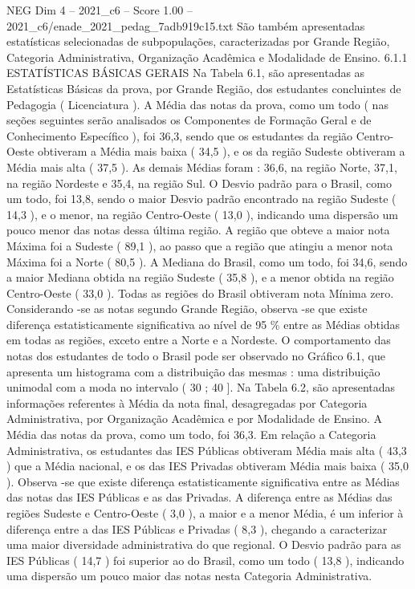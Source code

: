 \begin{textsample}{NEG Dim 4 – 2021\_c6 – Score 1.00 – 2021\_c6/enade\_2021\_pedag\_7adb919c15.txt}
São também apresentadas estatísticas selecionadas de subpopulações, caracterizadas por Grande Região, Categoria Administrativa, Organização Acadêmica e Modalidade de Ensino. 6.1.1 ESTATÍSTICAS BÁSICAS GERAIS Na Tabela 6.1, são apresentadas as Estatísticas Básicas da prova, por Grande Região, dos estudantes concluintes de Pedagogia ( Licenciatura ).
A Média das notas da prova, como um todo ( nas seções seguintes serão analisados os Componentes de Formação Geral e de Conhecimento Específico ), foi 36,3, sendo que os estudantes da região Centro-Oeste obtiveram a Média mais baixa ( 34,5 ), e os da região Sudeste obtiveram a Média mais alta ( 37,5 ).
As demais Médias foram : 36,6, na região Norte, 37,1, na região Nordeste e 35,4, na região Sul.
O Desvio padrão para o Brasil, como um todo, foi 13,8, sendo o maior Desvio padrão encontrado na região Sudeste ( 14,3 ), e o menor, na região Centro-Oeste ( 13,0 ), indicando uma dispersão um pouco menor das notas dessa última região.
A região que obteve a maior nota Máxima foi a Sudeste ( 89,1 ), ao passo que a região que atingiu a menor nota Máxima foi a Norte ( 80,5 ).
A Mediana do Brasil, como um todo, foi 34,6, sendo a maior Mediana obtida na região Sudeste ( 35,8 ), e a menor obtida na região Centro-Oeste ( 33,0 ).
Todas as regiões do Brasil obtiveram nota Mínima zero.
Considerando -se as notas segundo Grande Região, observa -se que existe diferença estatisticamente significativa ao nível de 95 \% entre as Médias obtidas em todas as regiões, exceto entre a Norte e a Nordeste.
O comportamento das notas dos estudantes de todo o Brasil pode ser observado no Gráfico 6.1, que apresenta um histograma com a distribuição das mesmas : uma distribuição unimodal com a moda no intervalo ( 30 ; 40 ].
Na Tabela 6.2, são apresentadas informações referentes à Média da nota final, desagregadas por Categoria Administrativa, por Organização Acadêmica e por Modalidade de Ensino.
A Média das notas da prova, como um todo, foi 36,3.
Em relação a Categoria Administrativa, os estudantes das IES Públicas obtiveram Média mais alta ( 43,3 ) que a Média nacional, e os das IES Privadas obtiveram Média mais baixa ( 35,0 ).
Observa -se que existe diferença estatisticamente significativa entre as Médias das notas das IES Públicas e as das Privadas.
A diferença entre as Médias das regiões Sudeste e Centro-Oeste ( 3,0 ), a maior e a menor Média, é um inferior à diferença entre a das IES Públicas e Privadas ( 8,3 ), chegando a caracterizar uma maior diversidade administrativa do que regional.
O Desvio padrão para as IES Públicas ( 14,7 ) foi superior ao do Brasil, como um todo ( 13,8 ), indicando uma dispersão um pouco maior das notas nesta Categoria Administrativa.

\end{textsample}
